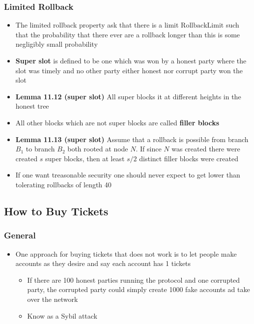 \documentclass[11pt]{article}
\begin{document}
\subsubsection{Limited Rollback}
\label{sec:orgb0fe131}
\begin{itemize}
\item The limited rollback property ask that there is a limit \(\text{RollbackLimit}\) such that the probability that there ever are a rollback longer than this is some negligibly small probability

\item \textbf{Super slot} is defined to be one which was won by a honest party where the slot was timely and no other party either honest nor corrupt party won the slot

\item \textbf{Lemma 11.12 (super slot)} All super blocks it at different heights in the honest tree

\item All other blocks which are not super blocks are called \textbf{filler blocks}

\item \textbf{Lemma 11.13 (super slot)} Assume that a rollback is possible from branch \(B_1\) to branch \(B_2\) both rooted at node \(N\). If since \(N\) was created there were created \(s\) super blocks, then at least \(s/2\) distinct filler blocks were created

\item If one want treasonable security one should never expect to get lower than tolerating rollbacks of length 40
\end{itemize}

\subsection{How to Buy Tickets}
\label{sec:org1c28766}
\subsubsection{General}
\label{sec:org94bdb25}
\begin{itemize}
\item One approach for buying tickets that does not work is to let people make accounts as they desire and say each account has 1 tickets
\begin{itemize}
\item If there are 100 honest parties running the protocol and one corrupted party, the corrupted party could simply create 1000 fake accounts ad take over the network
\item Know as a Sybil attack
\end{itemize}
\end{itemize}
\end{document}
